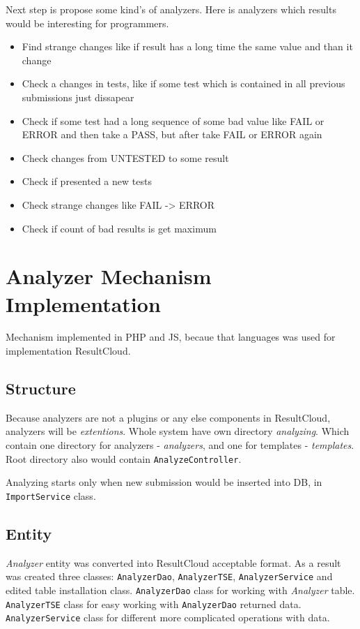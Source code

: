 Next step is propose some kind's of analyzers. Here is analyzers which results would be interesting for programmers.
\begin{itemize} 
\item Find strange changes like if result has a long time the same value and than it change
\item Check a changes in tests, like if some test which is contained in all previous submissions just dissapear
\item Check if some test had a long sequence of some bad value like FAIL or ERROR and then take a PASS, but after take FAIL or ERROR again
\item Check changes from UNTESTED to some result
\item Check if presented a new tests
\item Check strange changes like FAIL -> ERROR
\item Check if count of bad results is get maximum
\end{itemize}

\chapter{Analyzer Mechanism Implementation}

Mechanism implemented in PHP and JS, becaue that languages was used for implementation ResultCloud.

\section{Structure}

Because analyzers are not a plugins or any else components in ResultCloud, analyzers will be \emph{extentions}. Whole system have own directory \emph{analyzing}. Which contain one directory for analyzers - \emph{analyzers}, and one for templates - \emph{templates}. Root directory also would contain \texttt{AnalyzeController}.

Analyzing starts only when new submission would be inserted into DB, in \texttt{ImportService} class.

\section{Entity}

\emph{Analyzer} entity was converted into ResultCloud acceptable format. As a result was created three classes: \texttt{AnalyzerDao}, \texttt{AnalyzerTSE}, \texttt{AnalyzerService} and edited table installation class. \texttt{AnalyzerDao} class for working with \emph{Analyzer} table. \texttt{AnalyzerTSE} class for easy working with \texttt{AnalyzerDao} returned data. \texttt{AnalyzerService} class for different more complicated operations with data.

